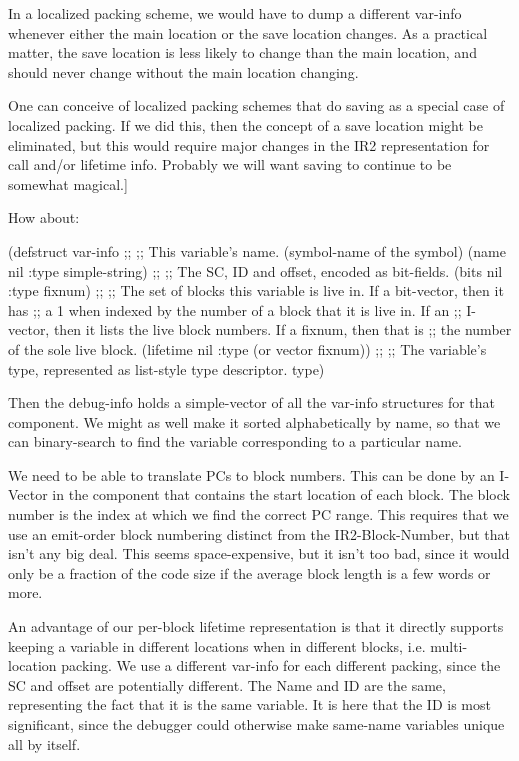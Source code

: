 In a localized packing scheme, we would have to dump a different var-info
whenever either the main location or the save location changes.  As a practical
matter, the save location is less likely to change than the main location, and
should never change without the main location changing.

One can conceive of localized packing schemes that do saving as a special case
of localized packing.  If we did this, then the concept of a save location
might be eliminated, but this would require major changes in the IR2
representation for call and/or lifetime info.  Probably we will want saving to
continue to be somewhat magical.]


How about:

(defstruct var-info
  ;;
  ;; This variable's name. (symbol-name of the symbol)
  (name nil :type simple-string)
  ;;
  ;; The SC, ID and offset, encoded as bit-fields.
  (bits nil :type fixnum)
  ;;
  ;; The set of blocks this variable is live in.  If a bit-vector, then it has
  ;; a 1 when indexed by the number of a block that it is live in.  If an
  ;; I-vector, then it lists the live block numbers.  If a fixnum, then that is
  ;; the number of the sole live block.
  (lifetime nil :type (or vector fixnum))
  ;;
  ;; The variable's type, represented as list-style type descriptor.
  type)

Then the debug-info holds a simple-vector of all the var-info structures for
that component.  We might as well make it sorted alphabetically by name, so
that we can binary-search to find the variable corresponding to a particular
name.

We need to be able to translate PCs to block numbers.  This can be done by an
I-Vector in the component that contains the start location of each block.  The
block number is the index at which we find the correct PC range.  This requires
that we use an emit-order block numbering distinct from the IR2-Block-Number,
but that isn't any big deal.  This seems space-expensive, but it isn't too bad,
since it would only be a fraction of the code size if the average block length
is a few words or more.

An advantage of our per-block lifetime representation is that it directly
supports keeping a variable in different locations when in different blocks,
i.e. multi-location packing.  We use a different var-info for each different
packing, since the SC and offset are potentially different.  The Name and ID
are the same, representing the fact that it is the same variable.  It is here
that the ID is most significant, since the debugger could otherwise make
same-name variables unique all by itself.



